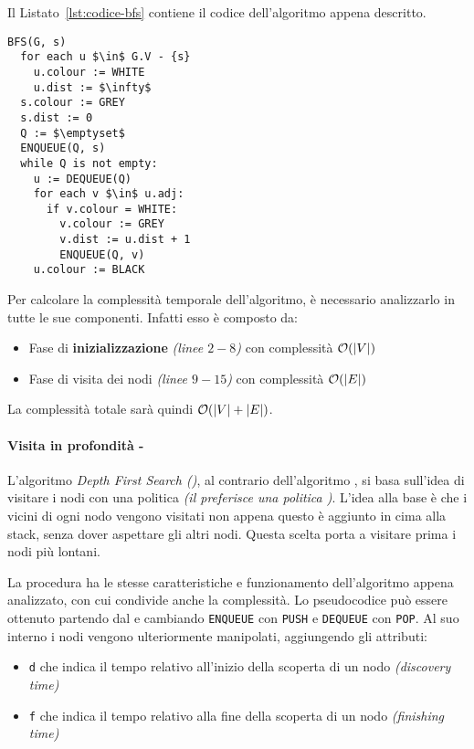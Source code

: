 \documentclass[italian, 10pt]{article}
\begin{document}
\bigskip
Il Listato~\ref{lst:codice-bfs} contiene il codice dell'algoritmo appena descritto.

\begin{lstlisting}[float, style=pseudocode, caption={Algoritmo \texttt{BFS}}, label={lst:codice-bfs}]
BFS(G, s)
  for each u $\in$ G.V - {s}
    u.colour := WHITE
    u.dist := $\infty$
  s.colour := GREY
  s.dist := 0
  Q := $\emptyset$
  ENQUEUE(Q, s)
  while Q is not empty:
    u := DEQUEUE(Q)
    for each v $\in$ u.adj:
      if v.colour = WHITE:
        v.colour := GREY
        v.dist := u.dist + 1
        ENQUEUE(Q, v)
    u.colour := BLACK
\end{lstlisting}

Per calcolare la complessità temporale dell'algoritmo, è necessario analizzarlo in tutte le sue componenti.
Infatti esso è composto da:

\begin{itemize}
  \item Fase di \textbf{inizializzazione} \textit{(linee \(2-8\))} con complessità \(\mathcal{O}(|V|)\)
  \item Fase di visita dei nodi \textit{(linee \(9-15\))} con complessità \(\mathcal{O}(|E|)\)
\end{itemize}

La complessità totale sarà quindi \(\mathcal{O}(|V|+|E|)\).

\paragraph{Visita in profondità - \DFS}
\label{par:grafi-dfs}

L'algoritmo \textit{Depth First Search (\DFS)}, al contrario dell'algoritmo \BFS, si basa sull'idea di visitare i nodi con una politica \LIFO \textit{(il \BFS preferisce una politica \FIFO)}.
L'idea alla base è che i vicini di ogni nodo vengono visitati non appena questo è aggiunto in cima alla stack, senza dover aspettare gli altri nodi.
Questa scelta porta a visitare prima i nodi più lontani.

La procedura ha le stesse caratteristiche e funzionamento dell'algoritmo \BFS appena analizzato, con cui condivide anche la complessità.
Lo pseudocodice può essere ottenuto partendo dal \DFS e cambiando \texttt{ENQUEUE} con \texttt{PUSH} e \texttt{DEQUEUE} con \texttt{POP}.
Al suo interno i nodi vengono ulteriormente manipolati, aggiungendo gli attributi:

\begin{itemize}
  \item \texttt{d} che indica il tempo relativo all'inizio della scoperta di un nodo \textit{(discovery time)}
  \item \texttt{f} che indica il tempo relativo alla fine della scoperta di un nodo \textit{(finishing time)}
\end{itemize}
\end{document}
